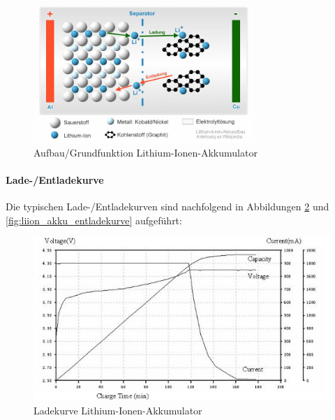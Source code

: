 \begin{figure}[h!]
	\centering
\includegraphics[width=0.74\textwidth]{images/aufbau_liion.jpg}
	\caption{Aufbau/Grundfunktion Lithium-Ionen-Akkumulator \cite{liion_akku_aufbau_funktion1}}
	\label{fig:liion_akku}
\end{figure}

\newpage

\paragraph{Lade-/Entladekurve}
Die typischen Lade-/Entladekurven sind nachfolgend in Abbildungen \ref{fig:liion_akku_ladekurve} und \ref{fig:liion_akku_entladekurve} aufgeführt:

\begin{figure}[h!]
	\centering
\includegraphics[width=1.0\textwidth]{images/liion_ladekurve.jpg}
	\caption{Ladekurve Lithium-Ionen-Akkumulator \cite{liion_ladekurve}}
\label{fig:liion_akku_ladekurve}
\end{figure}

